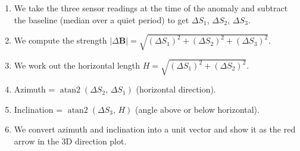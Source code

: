 \documentclass[11pt]{article}
\begin{document}
\begin{enumerate}
  \item We take the three sensor readings at the time of the anomaly and subtract the baseline (median over a quiet period) to get \(\Delta S_1\), \(\Delta S_2\), \(\Delta S_3\).
  \item We compute the strength \(|\Delta\mathbf{B}| = \sqrt{(\Delta S_1)^2 + (\Delta S_2)^2 + (\Delta S_3)^2}\).
  \item We work out the horizontal length \(H = \sqrt{(\Delta S_1)^2 + (\Delta S_2)^2}\).
  \item Azimuth = \(\operatorname{atan2}(\Delta S_2,\, \Delta S_1)\) (horizontal direction).
  \item Inclination = \(\operatorname{atan2}(\Delta S_3,\, H)\) (angle above or below horizontal).
  \item We convert azimuth and inclination into a unit vector and show it as the red arrow in the 3D direction plot.
\end{enumerate}
\end{document}
